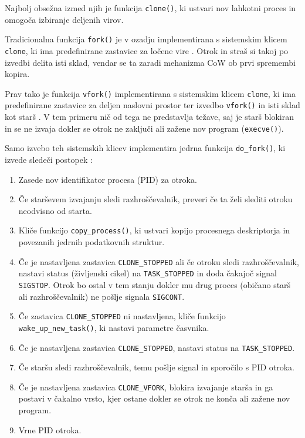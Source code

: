 \documentclass[a4paper,12pt,openright]{book}
\begin{document}
Najbolj obsežna izmed njih je funkcija \texttt{clone()}, ki ustvari nov lahkotni proces in omogoča izbiranje deljenih virov.

Tradicionalna funkcija \texttt{fork()} je v ozadju implementirana s sistemskim klicem \texttt{clone}, ki ima predefinirane zastavice za ločene vire \cite{Bovet_Cesati_2005}.
Otrok in straš si takoj po izvedbi delita isti sklad, vendar se ta zaradi mehanizma CoW ob prvi spremembi kopira.

Prav tako je funkcija \texttt{vfork()} implementirana s sistemskim klicem \texttt{clone}, ki ima predefinirane zastavice za deljen naslovni prostor ter izvedbo \texttt{vfork()} in isti sklad kot starš \cite{Bovet_Cesati_2005}.
V tem primeru nič od tega ne predstavlja težave, saj je starš blokiran in se ne izvaja dokler se otrok ne zaključi ali zažene nov program (\texttt{execve()}).

Samo izvebo teh sistemskih klicev implementira jedrna funkcija \texttt{do\_fork()}, ki izvede sledeči postopek \cite{Bovet_Cesati_2005}:
\begin{enumerate}
	\item Zasede nov identifikator procesa (PID) za otroka.
	\item Če starševem izvajanju sledi razhroščevalnik, preveri če ta želi slediti otroku neodvisno od starta.
	\item Kliče funkcijo \texttt{copy\_process()}, ki ustvari kopijo procesnega deskriptorja in povezanih jedrnih podatkovnih struktur.
	\item Če je nastavljena zastavica \texttt{CLONE\_STOPPED} ali če otroku sledi razhroščevalnik, nastavi status (življenski cikel) na \texttt{TASK\_STOPPED} in doda čakajoč signal \texttt{SIGSTOP}.
	      Otrok bo ostal v tem stanju dokler mu drug proces (običano starš ali razhroščevalnik) ne pošlje signala \texttt{SIGCONT}.
	\item Če zastavica \texttt{CLONE\_STOPPED} ni nastavljena, kliče funkcijo \texttt{wake\_up\_new\-\_task()}, ki nastavi parametre časvnika.
	\item Če je nastavljena zastavica \texttt{CLONE\_STOPPED}, nastavi status na \texttt{TASK\-\_STOPPED}.
	\item Če staršu sledi razhroščevalnik, temu pošlje signal in sporočilo s PID otroka.
	\item Če je nastavljena zastavica \texttt{CLONE\_VFORK}, blokira izvajanje starša in ga postavi v čakalno vrsto, kjer ostane dokler se otrok ne konča ali zažene nov program.
	\item Vrne PID otroka.
\end{enumerate}
\end{document}
